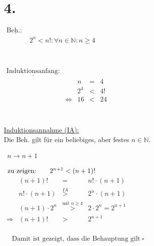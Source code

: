 \documentclass[a4paper]{scrartcl}
\newcommand{\qed}{\ \square}
\begin{document}
\newpage
\section{4.}
	\(		
	\begin{array}{llcl}
		\underline{\text{Beh.: }}& \\
			&2^n<n!:\forall n\in\mathbb{N}:n\geq 4 \\
	\end{array}
	\)\\ \\ \\
	\(
	\begin{array}{llrclcl}
		\underline{\text{Induktionsanfang:}}& \\
			&&n&=&4 \\
			&&2^4&<&4! \\
			&\Leftrightarrow &16&<&24 \\
	\end{array}
	\)\\ \\ \\
	\underline{Induktionsannahme (IA):}\\
	Die Beh. gilt für ein beliebiges, aber festes \(n\in\mathbb{N}\).\\ 
	\begin{flushleft}
		\underline{}\ \(n\rightarrow n+1\) \\
	\end{flushleft}
	\(
	\begin{array}{llrclclcl}
		\text{zu zeigen:} && 2^{n+1}<(n+1)!
	\end{array}\\ 
	\)\\ \(
	\begin{array}{lrclclcl}
		&(n+1)!&=&n!\cdot (n+1) \\
		& n!\cdot (n+1) &\overset{IA}{>}&2^n\cdot(n+1) \\
		&(n+1)\cdot 2^n &\overset{\text{mit }n\geq 4}{>}&2\cdot 2^n=2^{n+1} \\
		\Rightarrow & (n+1)!&>&2^{n+1}
		\end{array}			
	\)\\ \\ 
	\(
	\begin{array}{lcl}
		&\text{Damit ist gezeigt, dass die Behauptung gilt}\qed \\
	\end{array}
	\)
\end{document}
